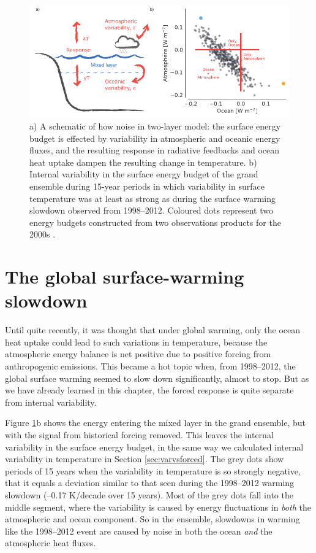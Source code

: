 \documentclass[12pt]{book}
\begin{document}
\begin{figure}
	\begin{center}
		\includegraphics[width=17 cm]{../illustrations/Variability_hiatus.pdf}
	\end{center}
	\caption{ a) A schematic of how noise in two-layer model: the surface energy budget is effected by variability in atmospheric and oceanic energy fluxes, and the resulting response in radiative feedbacks and ocean heat uptake dampen the resulting change in temperature. b) Internal variability in the surface energy budget of the grand ensemble during 15-year periods in which variability in surface temperature was at least as strong as during the surface warming slowdown observed from 1998--2012. Coloured dots represent two energy budgets constructed from two observations products for the 2000s \cite{Hedemann2017}.} 
	\label{fig:variability_hiatus}
\end{figure}

\section{The global surface-warming slowdown}
Until quite recently, it was thought that under global warming, only the ocean heat uptake could lead to such variations in temperature, because the atmospheric energy balance is net positive due to positive forcing from anthropogenic emissions. This became a hot topic when, from 1998--2012, the global surface warming seemed to slow down significantly, almost to stop. But as we have already learned in this chapter, the forced response is quite separate from internal variability. 

Figure \ref{fig:variability_hiatus}b shows the energy entering the mixed layer in the grand ensemble, but with the signal from historical forcing removed. This leaves the internal variability in the surface energy budget, in the same way we calculated internal variability in temperature in Section \ref{sec:varvsforced}. The grey dots show periods of 15 years when the variability in temperature is so strongly negative, that it equals a deviation similar to that seen during the 1998--2012 warming slowdown (--0.17 K/decade over 15 years). Most of the grey dots fall into the middle segment, where the variability is caused by energy fluctuations in \textit{both} the atmospheric and ocean component. So in the ensemble, slowdowns in warming  like the 1998--2012 event are caused by noise in both the ocean \textit{and} the atmospheric heat fluxes\cite{Hedemann2017}. 
\end{document}
